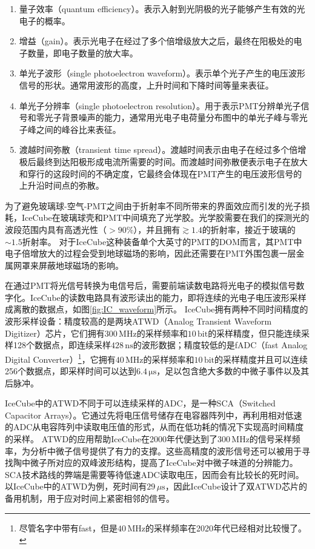 \begin{enumerate}
    \item 量子效率（quantum efficiency）。表示入射到光阴极的光子能够产生有效的光电子的概率。
    \item 增益（gain）。表示光电子在经过了多个倍增级放大之后，最终在阳极处的电子数量，即电子数量的放大率。
    \item 单光子波形（single photoelectron waveform）。表示单个光子产生的电压波形信号的形状。通常用波形的高度，上升时间和下降时间等量来表征。
    \item 单光子分辨率（single photoelectron resolution）。用于表示PMT分辨单光子信号和零光子背景噪声的能力，通常用光电子电荷量分布图中的单光子峰与零光子峰之间的峰谷比来表征。
    \item 渡越时间弥散（transient time spread）。渡越时间表示由电子在经过多个倍增极后最终到达阳极形成电流所需要的时间。而渡越时间弥散便表示电子在放大和穿行的这段时间的不确定度，它最终会体现在PMT产生的电压波形信号的上升沿时间点的弥散。
\end{enumerate}

为了避免玻璃球-空气-PMT之间由于折射率不同所带来的界面效应而引发的光子损耗，IceCube在玻璃球壳和PMT中间填充了光学胶。光学胶需要在我们的探测光的波段范围内具有高透光性（$>90\%$），并且拥有$\gtrsim 1.4$的折射率，接近于玻璃的$\sim 1.5$折射率。
对于IceCube这种装备单个大英寸的PMT的DOM而言，其PMT中电子倍增放大的过程会受到地球磁场的影响，因此还需要在PMT外围包裹一层金属网罩来屏蔽地球磁场的影响\cite{pmt_Earth_magnetic:2011}。

在通过PMT将光信号转换为电信号后，需要前端读数电路将光电子的模拟信号数字化。IceCube的读数电路具有波形读出的能力，即将连续的光电子电压波形采样成离散的数据点，如图\ref{fig:IC_waveform}所示\cite{IceCube_DAQ:2008}。
IceCube拥有两种不同时间精度的波形采样设备：精度较高的是两块ATWD（Analog Transient Waveform Digitizer）芯片，它们拥有$300\,\mathrm{MHz}$的采样频率和$10\,\mathrm{bit}$的采样精度，但只能连续采样128个数据点，即连续采样$428\,\mathrm{ns}$的波形数据；精度较低的是fADC（fast Analog Digital Converter）\footnote{尽管名字中带有fast，但是$40\,\mathrm{MHz}$的采样频率在2020年代已经相对比较慢了。}，它拥有$40\,\mathrm{MHz}$的采样频率和$10\,\mathrm{bit}$的采样精度并且可以连续256个数据点，即采样时间可以达到$6.4\,\mathrm{\mu s}$，足以包含绝大多数的中微子事件以及其后脉冲。

IceCube中的ATWD不同于可以连续采样的ADC，是一种SCA（Switched Capacitor Arrays）。它通过先将电压信号储存在电容器阵列中，再利用相对低速的ADC从电容阵列中读取电压值的形式，从而在低功耗的情况下实现高时间精度的采样\cite{DRS4:2010}。
ATWD的应用帮助IceCube在2000年代便达到了$300\,\mathrm{MHz}$的信号采样频率，为分析中微子信号提供了有力的支撑。这些高精度的波形信号还可以被用于寻找陶中微子所对应的双峰波形结构，提高了IceCube对中微子味道的分辨能力\cite{IceCube_tau_Donglian:2015, IceCube_tau_Logan:2019, IceCube_tau:2020}。
SCA技术路线的弊端是需要等待低速ADC读取电压，因而会有比较长的死时间。以IceCube中的ATWD为例，死时间有$29\,\mu\mathrm{s}$，因此IceCube设计了双ATWD芯片的备用机制，用于应对时间上紧密相邻的信号。

